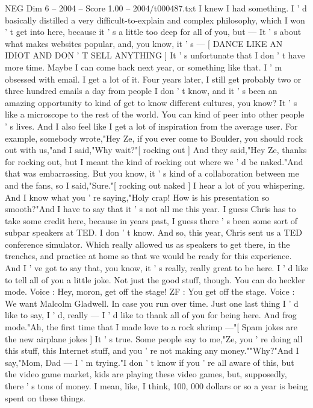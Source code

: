 \begin{textsample}{NEG Dim 6 – 2004 – Score 1.00 – 2004/t000487.txt}
I knew I had something.
I ' d basically distilled a very difficult-to-explain and complex philosophy, which I won ' t get into here, because it ' s a little too deep for all of you, but — It ' s about what makes websites popular, and, you know, it ' s — [ DANCE LIKE AN IDIOT AND DON ' T SELL ANYTHING ] It ' s unfortunate that I don ' t have more time.
Maybe I can come back next year, or something like that.
I ' m obsessed with email.
I get a lot of it.
Four years later, I still get probably two or three hundred emails a day from people I don ' t know, and it ' s been an amazing opportunity to kind of get to know different cultures, you know?
It ' s like a microscope to the rest of the world.
You can kind of peer into other people ' s lives.
And I also feel like I get a lot of inspiration from the average user.
For example, somebody wrote,"Hey Ze, if you ever come to Boulder, you should rock out with us,"and I said,"Why wait?"[ rocking out ] And they said,"Hey Ze, thanks for rocking out, but I meant the kind of rocking out where we ' d be naked."And that was embarrassing.
But you know, it ' s kind of a collaboration between me and the fans, so I said,"Sure."[ rocking out naked ] I hear a lot of you whispering.
And I know what you ' re saying,"Holy crap!
How is his presentation so smooth?"And I have to say that it ' s not all me this year.
I guess Chris has to take some credit here, because in years past, I guess there ' s been some sort of subpar speakers at TED.
I don ' t know.
And so, this year, Chris sent us a TED conference simulator.
Which really allowed us as speakers to get there, in the trenches, and practice at home so that we would be ready for this experience.
And I ' ve got to say that, you know, it ' s really, really great to be here.
I ' d like to tell all of you a little joke.
Not just the good stuff, though.
You can do heckler mode.
Voice : Hey, moron, get off the stage!
ZF : You get off the stage.
Voice : We want Malcolm Gladwell.
In case you run over time.
Just one last thing I ' d like to say, I ' d, really — I ' d like to thank all of you for being here.
And frog mode."Ah, the first time that I made love to a rock shrimp —"[ Spam jokes are the new airplane jokes ] It ' s true.
Some people say to me,"Ze, you ' re doing all this stuff, this Internet stuff, and you ' re not making any money.""Why?"And I say,"Mom, Dad — I ' m trying."I don ' t know if you ' re all aware of this, but the video game market, kids are playing these video games, but, supposedly, there ' s tons of money.
I mean, like, I think, 100, 000 dollars or so a year is being spent on these things.

\end{textsample}
